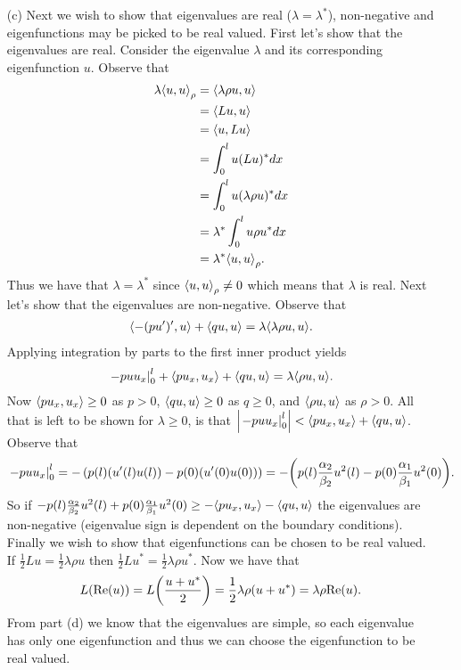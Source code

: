 \documentclass[12pt]{report}
\begin{document}
\begin{solution}
\begin{enumerate}
        \item [(c)]
        Next we wish to show that eigenvalues are real ($\lambda = \lambda^*$), non-negative and eigenfunctions may be picked to be real valued. First let's show that the eigenvalues are real. Consider the eigenvalue $\lambda$ and its corresponding eigenfunction $u$. Observe that
        \begin{align*}
            \lambda {\left\langle u,u\right\rangle}_\rho &= {\left\langle\lambda\rho u,u\right\rangle}\\
            &= {\left\langle Lu,u\right\rangle}\\
            &= {\left\langle u,Lu\right\rangle}\\
            &= \int_0^l u(Lu)^*dx\\
            &= \int_0^l u(\lambda\rho u)^*dx\\
            &= \lambda^* \int_0^l u\rho u^*dx\\
            &= \lambda^* {\left\langle u,u\right\rangle}_\rho.\\
        \end{align*}
        Thus we have that $\lambda = \lambda^*$ since ${\left\langle u,u\right\rangle}_\rho \neq 0$ which means that $\lambda$ is real. Next let's show that the eigenvalues are non-negative. Observe that
        \begin{align*}
            {\left\langle-(p u')',u\right\rangle} + {\left\langle qu,u\right\rangle} = \lambda{\left\langle\lambda\rho u, u\right\rangle}.
        \end{align*}
        Applying integration by parts to the first inner product yields
        \[ 
            \left. -puu_x \right|_0^l + {\left\langle pu_x,u_x\right\rangle} +{\left\langle qu,u\right\rangle} = \lambda{\left\langle\rho u, u\right\rangle}.
        \]
        Now ${\left\langle pu_x,u_x\right\rangle} \geq 0$ as $p > 0$, ${\left\langle qu,u\right\rangle} \geq 0$ as $q \geq 0$, and ${\left\langle\rho u, u\right\rangle}$ as $\rho > 0$. All that is left to be shown for $\lambda \geq 0$, is that $\left| \left. -puu_x \right|_0^l \right| < {\left\langle pu_x,u_x\right\rangle} +{\left\langle qu,u\right\rangle}$. Observe that
        \[ 
            \left. -puu_x \right|_0^l = -\left(p(l)(u'(l)u(l)) - p(0)(u'(0)u(0))\right) = -{\left(p(l)\frac{\alpha_2}{\beta_2}u^2(l) - p(0)\frac{\alpha_1}{\beta_1}u^2(0)\right)}.
        \]
        So if $-p(l)\frac{\alpha_2}{\beta_2}u^2(l) + p(0)\frac{\alpha_1}{\beta_1}u^2(0) \geq -{\left\langle pu_x,u_x\right\rangle} - {\left\langle qu,u\right\rangle}$ the eigenvalues are non-negative (eigenvalue sign is dependent on the boundary conditions).
        Finally we wish to show that eigenfunctions can be chosen to be real valued. If $\frac{1}{2}Lu = \frac{1}{2}\lambda \rho u$ then $\frac{1}{2}Lu^* = \frac{1}{2}\lambda \rho u^*$. Now we have that 
        \[ 
            L(\text{Re}(u)) = L{\left(\frac{u+u^*}{2}\right)} = \frac{1}{2}\lambda\rho(u + u^*) = \lambda\rho \text{Re}(u).
        \] 
        From part (d) we know that the eigenvalues are simple, so each eigenvalue has only one eigenfunction and thus we can choose the eigenfunction to be real valued. 



\end{enumerate}
\end{solution}
\end{document}
